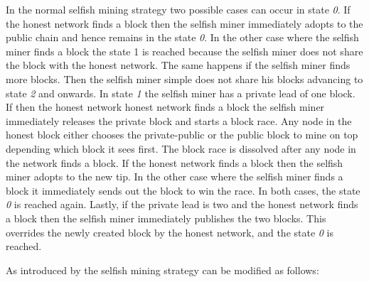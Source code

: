 In the normal selfish mining strategy two possible cases can occur in state \textit{0}.
If the honest network finds a block then the selfish miner immediately adopts to the public chain and hence remains in the state \textit{0}.
In the other case where the selfish miner finds a block the state 1 is reached because the selfish miner does not share the block with the honest network.
The same happens if the selfish miner finds more blocks.
Then the selfish miner simple does not share his blocks advancing to state \textit{2} and onwards.
In state \textit{1} the selfish miner has a private lead of one block.
If then the honest network honest network finds a block the selfish miner immediately releases the private block and starts a block race.
Any node in the honest block either chooses the private-public or the public block to mine on top depending which block it sees first.
The block race is dissolved after any node in the network finds a block.
If the honest network finds a block then the selfish miner adopts to the new tip.
In the other case where the selfish miner finds a block it immediately sends out the block to win the race.
In both cases, the state \textit{0} is reached again.
Lastly, if the private lead is two and the honest network finds a block then the selfish miner immediately publishes the two blocks.
This overrides the newly created block by the honest network, and the state \textit{0} is reached.

As introduced by \cite{nayak2016stubborn} the selfish mining strategy can be modified as follows:


